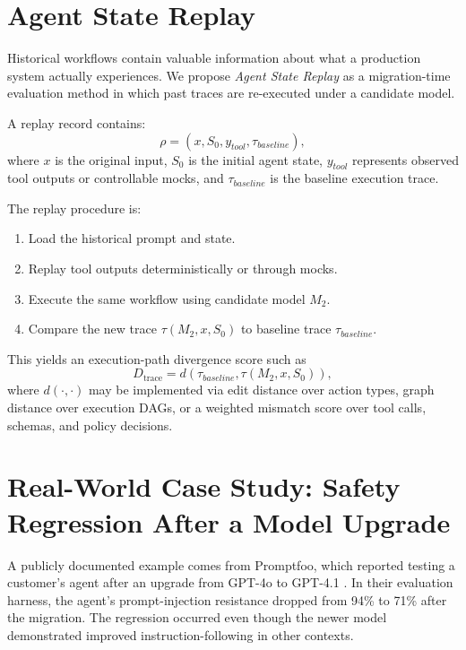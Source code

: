 \documentclass[11pt]{article}
\begin{document}
\section{Agent State Replay}
Historical workflows contain valuable information about what a production system actually experiences. We propose \emph{Agent State Replay} as a migration-time evaluation method in which past traces are re-executed under a candidate model.

A replay record contains:
\begin{equation}
\rho = (x, S_0, y_{tool}, \tau_{baseline}),
\end{equation}
where $x$ is the original input, $S_0$ is the initial agent state, $y_{tool}$ represents observed tool outputs or controllable mocks, and $\tau_{baseline}$ is the baseline execution trace.

The replay procedure is:
\begin{enumerate}[leftmargin=*, itemsep=0.3em]
    \item Load the historical prompt and state.
    \item Replay tool outputs deterministically or through mocks.
    \item Execute the same workflow using candidate model $M_2$.
    \item Compare the new trace $\tau(M_2, x, S_0)$ to baseline trace $\tau_{baseline}$.
\end{enumerate}

This yields an execution-path divergence score such as
\begin{equation}
D_{\mathrm{trace}} = d(\tau_{baseline}, \tau(M_2, x, S_0)),
\end{equation}
where $d(\cdot, \cdot)$ may be implemented via edit distance over action types, graph distance over execution DAGs, or a weighted mismatch score over tool calls, schemas, and policy decisions.

\section{Real-World Case Study: Safety Regression After a Model Upgrade}
A publicly documented example comes from Promptfoo, which reported testing a customer's agent after an upgrade from GPT-4o to GPT-4.1 \cite{promptfoo2026}. In their evaluation harness, the agent's prompt-injection resistance dropped from 94\% to 71\% after the migration. The regression occurred even though the newer model demonstrated improved instruction-following in other contexts.
\end{document}
